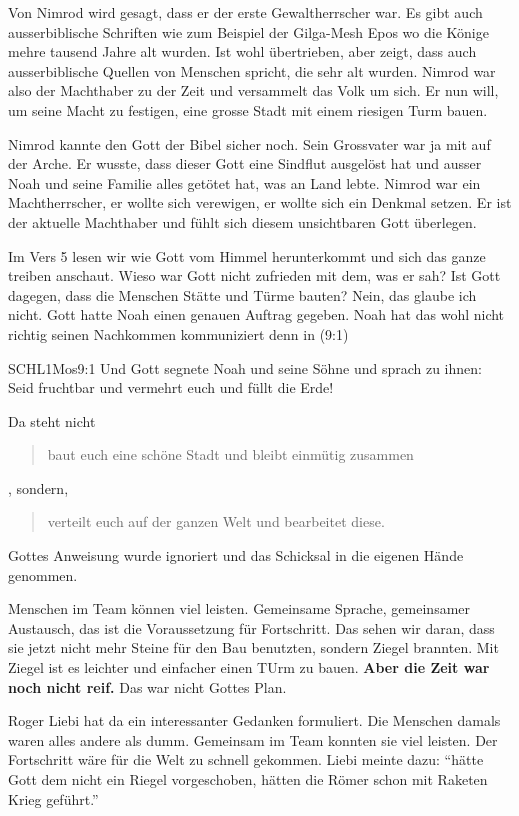 \documentclass[14pt]{../../inc/mybib}
\newcommand{\q}[1]{\blockquote{#1}}
\newenvironment{block}[1][]{%
  \vspace{1.5em}%
  \noindent\textbf{#1}\par%
  \vspace{0.0em}%
}{%
  \vspace{1em}%
}
\begin{document}
\begin{block}
    Von Nimrod wird gesagt, dass er der erste Gewaltherrscher war. Es gibt auch ausserbiblische Schriften wie zum Beispiel der Gilga-Mesh Epos wo die Könige mehre tausend Jahre alt wurden. Ist wohl übertrieben, aber zeigt, dass auch ausserbiblische Quellen von Menschen spricht, die sehr alt wurden. Nimrod war also der Machthaber zu der Zeit und versammelt das Volk um sich. Er nun will, um seine Macht zu festigen, eine grosse Stadt mit einem riesigen Turm bauen.
\end{block}
\begin{block}
    Nimrod kannte den Gott der Bibel sicher noch. Sein Grossvater war ja mit auf der Arche. Er wusste, dass dieser Gott eine Sindflut ausgelöst hat und ausser Noah und seine Familie alles getötet hat, was an Land lebte. Nimrod war ein Machtherrscher, er wollte sich verewigen, er wollte sich ein Denkmal setzen. Er ist der aktuelle Machthaber und fühlt sich diesem unsichtbaren Gott überlegen.
\end{block}
\begin{block}
    Im Vers 5 lesen wir wie Gott vom Himmel herunterkommt und sich das ganze treiben anschaut. Wieso war Gott nicht zufrieden mit dem, was er sah? Ist Gott dagegen, dass die Menschen Stätte und Türme bauten? Nein, das glaube ich nicht. Gott hatte Noah einen genauen Auftrag gegeben. Noah hat das wohl nicht richtig seinen Nachkommen kommuniziert denn in (9:1)
    \begin{bibelbox}{SCHL}{1Mos}{9:1}
        Und Gott segnete Noah und seine Söhne und sprach zu ihnen: Seid fruchtbar und vermehrt euch und füllt die Erde!
    \end{bibelbox}    
    
    Da steht nicht \q{baut euch eine schöne Stadt und  bleibt einmütig zusammen}, sondern, \q{verteilt euch auf der ganzen Welt und bearbeitet diese.} Gottes Anweisung wurde ignoriert und das Schicksal in die eigenen Hände genommen. 
\end{block}
\begin{block}
    Menschen im Team können viel leisten. Gemeinsame Sprache, gemeinsamer Austausch, das ist die Voraussetzung für Fortschritt. Das sehen wir daran, dass sie jetzt nicht mehr Steine für den Bau benutzten, sondern Ziegel brannten. Mit Ziegel ist es leichter und einfacher einen TUrm zu bauen. \textbf{Aber die Zeit war noch nicht reif.} Das war nicht Gottes Plan.
\end{block}
\begin{block}
    Roger Liebi hat da ein interessanter Gedanken formuliert. Die Menschen damals waren alles andere als dumm. Gemeinsam im Team konnten sie viel leisten. Der Fortschritt wäre für die Welt zu schnell gekommen. Liebi meinte dazu: \enquote{hätte Gott dem nicht ein Riegel vorgeschoben, hätten die Römer schon mit Raketen Krieg geführt.}
\end{block}
\end{document}
